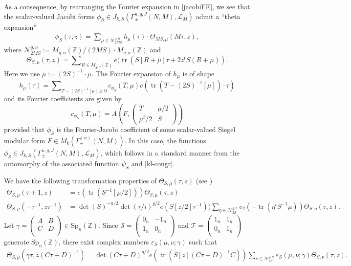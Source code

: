 \documentclass[11pt]{amsart}
\numberwithin{equation}{section}
\newcommand{\mbb}{\mathbb}
\newcommand{\mc}{\mathcal}
\newcommand{\mrm}{\mathrm} %
\newcommand{\smat}[4]{\left( \begin{smallmatrix} #1 & #2 \\ #3 & #4 \\ \end{smallmatrix} \right)}
\DeclareMathOperator{\tr}{tr}
\newcommand{\z}{\mathbb{Z}}
\newcommand{\sumn}{\sum \nolimits}
\begin{document}
As a consequence, by rearranging the Fourier expansion in \eqref{jacobiFE}, we see that the scalar-valued Jacobi forms  $\phi_S\in J_{k, S}(\Gamma_\pm^{n,g,J}(N,M),\mc L_M)$ admit a ``theta expansion''
\begin{align}\label{theta-decomp}
    \phi_S(\tau, z)=\sumn_{\mu\in \mc N_{2MS}^{g,n}} h_{\mu}(\tau)\cdot \Theta_{MS, \mu}(M\tau,z),
\end{align}
where $\mc N_{2MS}^{g,n}:= M_{g,n}(\mbb Z)/(2MS)\cdot  M_{g,n}(\mbb Z)$
and
\[\Theta_{S, \mu}(\tau,z)=\sumn_{R\in M_{g,n}(\z)}
e(\tr( S[R+{\overline\mu}]\tau+ 2 z^t S(R+{\overline\mu})).\]
Here we use ${\overline\mu}:= (2S)^{-1}\cdot \mu$. The Fourier expansion of $h_{\mu}$ is of shape
\begin{equation} \label{hmu-fe}
h_{\mu}(\tau)=\sumn_{T -(2S)^{-1}[\mu]\ge 0} c_{\phi_S}(T ,\mu) e(\tr(T- (2S)^{-1}[\mu])\cdot \tau)
\end{equation}
and its Fourier coefficients are given  by 
\begin{equation}
c_{\phi_S}(T ,\mu) = A\left(F, \left(\begin{smallmatrix} T & \mu/2\\
\mu^t/2 & S\end{smallmatrix} \right) \right)
\label{relation}
\end{equation}
provided that $\phi_S$ is the Fourier-Jacobi coefficient of
some scalar-valued Siegel modular form $F\in M_k(\Gamma_\pm^{(n)}(N,M))$. In this case, the functions $\phi_S \in J_{k, S}(\Gamma_\pm^{n,g,J}(N,M), \mc L_M)$, which follows in a standard manner from the automorphy of the associated function $\psi_S$ and \eqref{kl-congr}.


We have the following transformation properties of $\Theta_{S, \mu}(\tau,z)$ (see \cite{ziegler1989jacobi})
\begin{align}\label{theta-trans}
\Theta_{S, \mu}(\tau+1,z)&=  e(\tr(S^{-1}[\mu/2])) \Theta_{S, \mu}(\tau,z)\\
\Theta_{S, \mu}(-\tau^{-1},z \tau^{-1})&=\det(S)^{-n/2}\det(\tau/i)^{g/2}e(S[z/2]\tau^{-1}))\sum_{\eta\in \mc N_{2S}^{g,n}}e_2(-\tr(\eta^t S^{-1} \mu))\Theta_{S, \eta}(\tau,z). \label{S-theta-trans}
\end{align}
Let $\gamma=\smat{A}{B}{C}{D}\in \mrm{Sp}_n(\mbb Z)$. Since $\mc S=\smat{0_n}{-1_n}{1_n}{0_n}$ and $\mc T=\smat{1_n}{1_n}{0_n}{1_n}$ generate $\mrm{Sp}_n(\mbb Z)$, there exist complex numbers $\varepsilon_S(\mu, \nu; \gamma)$ such that
\begin{align}\label{thetatransSpn}
\Theta_{S, \mu}(\gamma\tau,z(C\tau+D)^{-1})= \det(C\tau+D)^{g/2}e(\tr(S[z](C\tau+D)^{-1}C))\sum_{\nu\in \mc N_{2S}^{g,n}}\varepsilon_S(\mu, \nu; \gamma)\Theta_{S, \nu}(\tau,z).
\end{align}
\end{document}
